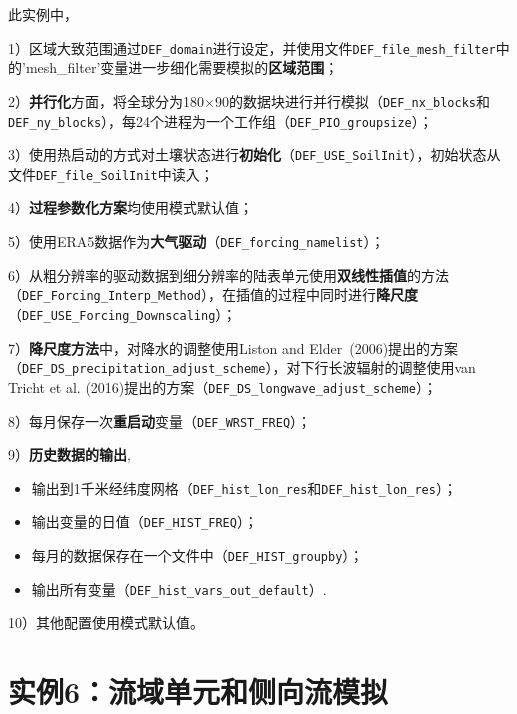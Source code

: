 此实例中，\par
1）区域大致范围通过\texttt{DEF\_domain}进行设定，并使用文件\texttt{DEF\_file\_mesh\_filter}中的'mesh\_filter'变量进一步细化需要模拟的\textbf{区域范围}；\par
2）\textbf{并行化}方面，将全球分为180\textdegree$\times$90\textdegree 的数据块进行并行模拟（\texttt{DEF\_nx\_blocks}和\texttt{DEF\_ny\_blocks}），每24个进程为一个工作组（\texttt{DEF\_PIO\_groupsize}）；\par
3）使用热启动的方式对土壤状态进行\textbf{初始化}（\texttt{DEF\_USE\_SoilInit}），初始状态从文件\texttt{DEF\_file\_SoilInit}中读入；\par
4）\textbf{过程参数化方案}均使用模式默认值；\par
5）使用ERA5数据作为\textbf{大气驱动}（\texttt{DEF\_forcing\_namelist}）；\par
6）从粗分辨率的驱动数据到细分辨率的陆表单元使用\textbf{双线性插值}的方法\\ （\texttt{DEF\_Forcing\_Interp\_Method}），在插值的过程中同时进行\textbf{降尺度}\\ （\texttt{DEF\_USE\_Forcing\_Downscaling}）；\par
7）\textbf{降尺度方法}中，对降水的调整使用Liston and Elder~(2006)提出的方案\\ （\texttt{DEF\_DS\_precipitation\_adjust\_scheme}），对下行长波辐射的调整使用van Tricht et al. (2016)提出的方案（\texttt{DEF\_DS\_longwave\_adjust\_scheme}）；\par
8）每月保存一次\textbf{重启动}变量（\texttt{DEF\_WRST\_FREQ}）；\par
9）\textbf{历史数据的输出},
\begin{itemize}[nosep,leftmargin=4em]
    \item 输出到1千米经纬度网格（\texttt{DEF\_hist\_lon\_res}和\texttt{DEF\_hist\_lon\_res}）；
    \item 输出变量的日值（\texttt{DEF\_HIST\_FREQ}）；
    \item 每月的数据保存在一个文件中（\texttt{DEF\_HIST\_groupby}）；
    \item 输出所有变量（\texttt{DEF\_hist\_vars\_out\_default}）.
\end{itemize}\par
10）其他配置使用模式默认值。


\section{实例6：流域单元和侧向流模拟}

